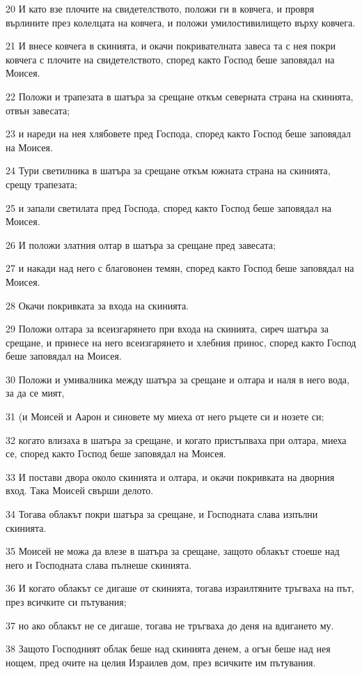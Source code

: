 \par 20 И като взе плочите на свидетелството, положи ги в ковчега, и провря върлините през колелцата на ковчега, и положи умилостивилището върху ковчега.
\par 21 И внесе ковчега в скинията, и окачи покривателната завеса та с нея покри ковчега с плочите на свидетелството, според както Господ беше заповядал на Моисея.
\par 22 Положи и трапезата в шатъра за срещане откъм северната страна на скинията, отвън завесата;
\par 23 и нареди на нея хлябовете пред Господа, според както Господ беше заповядал на Моисея.
\par 24 Тури светилника в шатъра за срещане откъм южната страна на скинията, срещу трапезата;
\par 25 и запали светилата пред Господа, според както Господ беше заповядал на Моисея.
\par 26 И положи златния олтар в шатъра за срещане пред завесата;
\par 27 и накади над него с благовонен темян, според както Господ беше заповядал на Моисея.
\par 28 Окачи покривката за входа на скинията.
\par 29 Положи олтара за всеизгарянето при входа на скинията, сиреч шатъра за срещане, и принесе на него всеизгарянето и хлебния принос, според както Господ беше заповядал на Моисея.
\par 30 Положи и умивалника между шатъра за срещане и олтара и наля в него вода, за да се мият,
\par 31 (и Моисей и Аарон и синовете му миеха от него ръцете си и нозете си;
\par 32 когато влизаха в шатъра за срещане, и когато пристъпваха при олтара, миеха се, според както Господ беше заповядал на Моисея.
\par 33 И постави двора около скинията и олтара, и окачи покривката на дворния вход. Така Моисей свърши делото.
\par 34 Тогава облакът покри шатъра за срещане, и Господната слава изпълни скинията.
\par 35 Моисей не можа да влезе в шатъра за срещане, защото облакът стоеше над него и Господната слава пълнеше скинията.
\par 36 И когато облакът се дигаше от скинията, тогава израилтяните тръгваха на път, през всичките си пътувания;
\par 37 но ако облакът не се дигаше, тогава не тръгваха до деня на вдигането му.
\par 38 Защото Господният облак беше над скинията денем, а огън беше над нея нощем, пред очите на целия Израилев дом, през всичките им пътувания.

